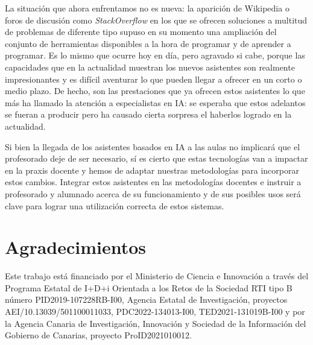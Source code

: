\documentclass[twocolumn,twoside,a4paper, 10pt]{article}
\begin{document}
La situación que ahora enfrentamos no es nueva: la aparición de Wikipedia 
o foros de discusión como
\textit{StackOverflow} en los que se ofrecen soluciones a multitud de problemas de diferente tipo supuso en su
momento una ampliación del conjunto de herramientas disponibles a la hora de programar y de aprender a
programar.
Es lo mismo que ocurre hoy en día, pero agravado si cabe, porque las capacidades que en la
actualidad muestran los nuevos asistentes son realmente impresionantes y es difícil aventurar lo que pueden
llegar a ofrecer en un corto o medio plazo.
De hecho, son las prestaciones que ya ofrecen estos asistentes lo que más ha llamado la atención a
especialistas en IA: se esperaba que estos adelantos se fueran a producir pero ha causado cierta sorpresa el
haberlos logrado en la actualidad.

Si bien la llegada de los asistentes basados en IA a las aulas no implicará que el profesorado deje de ser
necesario, sí es cierto que estas tecnologías van a impactar en la praxis docente y hemos de adaptar nuestras
metodologías para incorporar estos cambios.
Integrar estos asistentes en las metodologías docentes e instruir a profesorado y alumnado acerca de su 
funcionamiento y de sus posibles usos será clave para lograr una utilización correcta de estos sistemas.

\section*{Agradecimientos}
Este trabajo está financiado por el Ministerio de 
Ciencia e Innovación a través del Programa Estatal de I+D+i Orientada a los Retos de la Sociedad RTI tipo B número 
PID2019-107228RB-I00, Agencia Estatal de Investigación, proyectos AEI/10.13039/501100011033,
PDC2022-134013-I00, TED2021-131019B-I00 
y por la Agencia Canaria de Investigación, Innovación y Sociedad de la Información del Gobierno de Canarias, proyecto
ProID2021010012.



\balance{}


\end{document}
